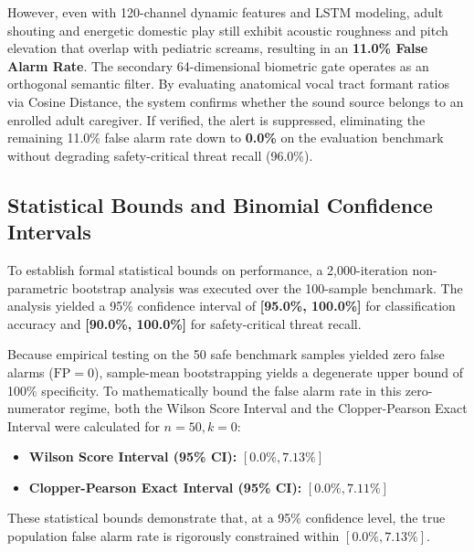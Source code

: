 \documentclass[12pt, a4paper]{report}
\begin{document}
However, even with 120-channel dynamic features and LSTM modeling, adult shouting and energetic domestic play still exhibit acoustic roughness and pitch elevation that overlap with pediatric screams, resulting in an \textbf{11.0\% False Alarm Rate}. The secondary 64-dimensional biometric gate operates as an orthogonal semantic filter. By evaluating anatomical vocal tract formant ratios via Cosine Distance, the system confirms whether the sound source belongs to an enrolled adult caregiver. If verified, the alert is suppressed, eliminating the remaining 11.0\% false alarm rate down to \textbf{0.0\%} on the evaluation benchmark without degrading safety-critical threat recall (96.0\%).

\subsection{Statistical Bounds and Binomial Confidence Intervals}
To establish formal statistical bounds on performance, a 2,000-iteration non-parametric bootstrap analysis was executed over the 100-sample benchmark. The analysis yielded a 95\% confidence interval of \textbf{[95.0\%, 100.0\%]} for classification accuracy and \textbf{[90.0\%, 100.0\%]} for safety-critical threat recall.

Because empirical testing on the 50 safe benchmark samples yielded zero false alarms ($\text{FP} = 0$), sample-mean bootstrapping yields a degenerate upper bound of 100\% specificity. To mathematically bound the false alarm rate in this zero-numerator regime, both the Wilson Score Interval and the Clopper-Pearson Exact Interval were calculated for $n=50, k=0$:
\begin{itemize}
    \item \textbf{Wilson Score Interval (95\% CI):} $[0.0\%, 7.13\%]$
    \item \textbf{Clopper-Pearson Exact Interval (95\% CI):} $[0.0\%, 7.11\%]$
\end{itemize}
These statistical bounds demonstrate that, at a 95\% confidence level, the true population false alarm rate is rigorously constrained within $\mathbf{[0.0\%, 7.13\%]}$.
\end{document}
